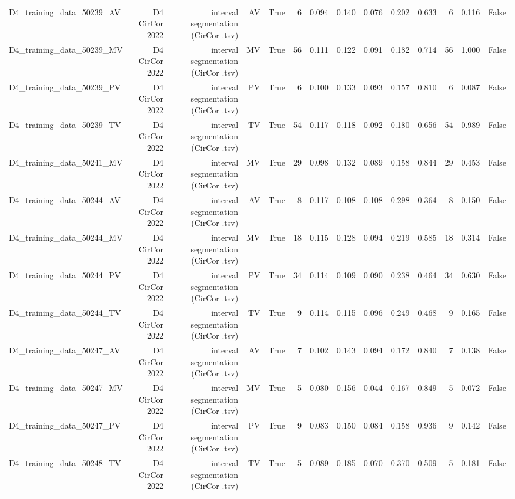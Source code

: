 \begin{table}[htbp]
\begin{tabular}{lrrrrrrrrrrrrr}
    D4\_training\_data\_50239\_AV & D4 CirCor 2022 & interval segmentation (CirCor .tsv) & AV & True & 6 & 0.094 & 0.140 & 0.076 & 0.202 & 0.633 & 6 & 0.116 & False \\
    D4\_training\_data\_50239\_MV & D4 CirCor 2022 & interval segmentation (CirCor .tsv) & MV & True & 56 & 0.111 & 0.122 & 0.091 & 0.182 & 0.714 & 56 & 1.000 & False \\
    D4\_training\_data\_50239\_PV & D4 CirCor 2022 & interval segmentation (CirCor .tsv) & PV & True & 6 & 0.100 & 0.133 & 0.093 & 0.157 & 0.810 & 6 & 0.087 & False \\
    D4\_training\_data\_50239\_TV & D4 CirCor 2022 & interval segmentation (CirCor .tsv) & TV & True & 54 & 0.117 & 0.118 & 0.092 & 0.180 & 0.656 & 54 & 0.989 & False \\
    D4\_training\_data\_50241\_MV & D4 CirCor 2022 & interval segmentation (CirCor .tsv) & MV & True & 29 & 0.098 & 0.132 & 0.089 & 0.158 & 0.844 & 29 & 0.453 & False \\
    D4\_training\_data\_50244\_AV & D4 CirCor 2022 & interval segmentation (CirCor .tsv) & AV & True & 8 & 0.117 & 0.108 & 0.108 & 0.298 & 0.364 & 8 & 0.150 & False \\
    D4\_training\_data\_50244\_MV & D4 CirCor 2022 & interval segmentation (CirCor .tsv) & MV & True & 18 & 0.115 & 0.128 & 0.094 & 0.219 & 0.585 & 18 & 0.314 & False \\
    D4\_training\_data\_50244\_PV & D4 CirCor 2022 & interval segmentation (CirCor .tsv) & PV & True & 34 & 0.114 & 0.109 & 0.090 & 0.238 & 0.464 & 34 & 0.630 & False \\
    D4\_training\_data\_50244\_TV & D4 CirCor 2022 & interval segmentation (CirCor .tsv) & TV & True & 9 & 0.114 & 0.115 & 0.096 & 0.249 & 0.468 & 9 & 0.165 & False \\
    D4\_training\_data\_50247\_AV & D4 CirCor 2022 & interval segmentation (CirCor .tsv) & AV & True & 7 & 0.102 & 0.143 & 0.094 & 0.172 & 0.840 & 7 & 0.138 & False \\
    D4\_training\_data\_50247\_MV & D4 CirCor 2022 & interval segmentation (CirCor .tsv) & MV & True & 5 & 0.080 & 0.156 & 0.044 & 0.167 & 0.849 & 5 & 0.072 & False \\
    D4\_training\_data\_50247\_PV & D4 CirCor 2022 & interval segmentation (CirCor .tsv) & PV & True & 9 & 0.083 & 0.150 & 0.084 & 0.158 & 0.936 & 9 & 0.142 & False \\
    D4\_training\_data\_50248\_TV & D4 CirCor 2022 & interval segmentation (CirCor .tsv) & TV & True & 5 & 0.089 & 0.185 & 0.070 & 0.370 & 0.509 & 5 & 0.181 & False \\

\end{tabular}
\end{table}
